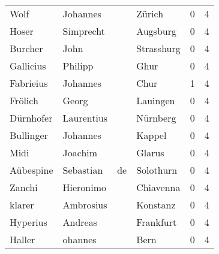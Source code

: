 \documentclass[10pt,a4paper,landscape]{article}
\begin{document}
\begin{longtable}{llllrr}
                     Wolf &                           Johannes &             &                                      Zürich &          0 &         4 \\
                    Hoser &                          Simprecht &             &                                    Augsburg &          0 &         4 \\
                  Burcher &                               John &             &                                  Strasshurg &          0 &         4 \\
                Gallicius &                            Philipp &             &                                        Ghur &          0 &         4 \\
                Fabrieius &                           Johannes &             &                                        Chur &          1 &         4 \\
                  Frölich &                              Georg &             &                                    Lauingen &          0 &         4 \\
                Dürnhofer &                         Laurentius &             &                                    Nürnberg &          0 &         4 \\
                Bullinger &                           Johannes &             &                                      Kappel &          0 &         4 \\
                     Midi &                            Joachim &             &                                      Glarus &          0 &         4 \\
                Aübespine &                          Sebastian &          de &                                   Solothurn &          0 &         4 \\
                   Zanchi &                          Hieronimo &             &                                   Chiavenna &          0 &         4 \\
                   klarer &                          Ambrosius &             &                                    Konstanz &          0 &         4 \\
                 Hyperius &                            Andreas &             &                                   Frankfurt &          0 &         4 \\
                   Haller &                            ohannes &             &                                        Bern &          0 &         4 \\

\end{longtable}
\end{document}
